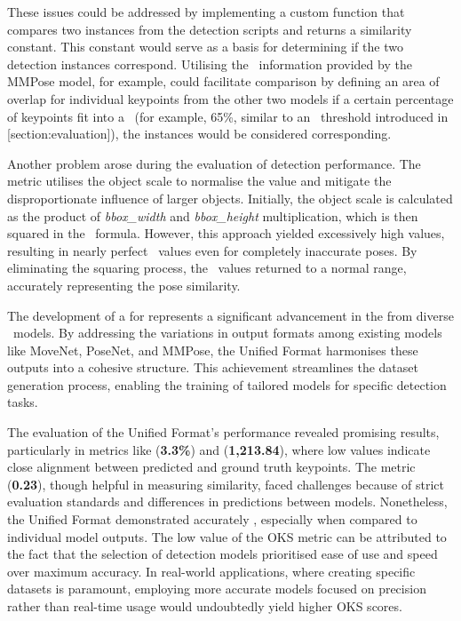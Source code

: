 These issues could be addressed by implementing a custom function that compares two instances from the detection scripts and returns a similarity constant. This constant would serve as a basis for determining if the two detection instances correspond. Utilising the \BBOX\ information provided by the MMPose model, for example, could facilitate comparison by defining an area of overlap for individual keypoints from the other two models if a certain percentage of keypoints fit into a \BBOX\ (for example, 65\%, similar to an \IoU\ threshold introduced in [section:evaluation]), the instances would be considered corresponding.

Another problem arose during the evaluation of detection performance. The \pojem{\OKS} metric utilises the object scale to normalise the value and mitigate the disproportionate influence of larger objects. Initially, the object scale is calculated as the product of {\it bbox_width} and {\it bbox_height} multiplication, which is then squared in the \OKS\ formula. However, this approach yielded excessively high values, resulting in nearly perfect \OKS\ values even for completely inaccurate poses. By eliminating the squaring process, the \OKS\ values returned to a normal range, accurately representing the pose similarity.


The development of a  for  represents a significant advancement in  the  from diverse \NN\ models. By addressing the variations in output formats among existing models like MoveNet, PoseNet, and MMPose, the Unified Format harmonises these outputs into a cohesive structure. This achievement streamlines the dataset generation process, en\-abling the training of tailored models for specific detection tasks.

The evaluation of the Unified Format's performance revealed promising results, particularly in metrics like \pojem{\APE} ({\bf 3.3\%}) and \pojem{\MSE} ({\bf 1,213.84}), where low values indicate close alignment between predicted and ground truth keypoints. The \pojem{\OKS} metric ({\bf 0.23}), though helpful in measuring similarity, faced challenges because of strict evaluation standards and differences in predictions between models. Nonetheless, the Unified Format demonstrated  accurately , especially when compared to individual model outputs. The low value of the OKS metric can be attributed to the fact that the selection of detection models prioritised ease of use and speed over maximum accuracy. In real-world applications, where creating specific datasets is paramount, employing more accurate models focused on precision rather than real-time usage would undoubtedly yield higher OKS scores.

